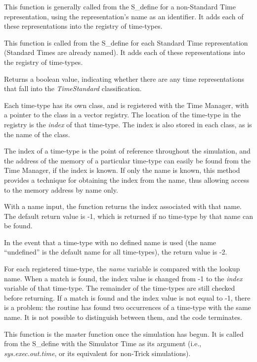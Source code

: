 {\begin{enumerate}
{\begin{enumerate}
This function is generally called from the S\_define for a non-Standard Time
representation, using the representation's name as an
identifier.  It adds each of these representations into the registry of
time-types.

This function is called from the S\_define for each Standard Time
representation (Standard Times are already named).  It adds each of these 
representations into the registry of time-types.

Returns a boolean value, indicating whether there are any time
representations that fall into the \textit{TimeStandard} classification.

\label{ref:timetypeslookup}Each time-type has its own class, and is
registered with the Time Manager, with a pointer to the class in a
vector registry.  The location of the time-type in the registry is the
\textit{index} of that time-type.  The index is also stored in each
class, as is the name of the class.

The index of a time-type is the point of reference throughout the
simulation, and the address of the memory of a particular time-type can
easily be found from the Time Manager, if the index is known.  If only the name
is known, this method provides a technique for obtaining the index from the
name, thus allowing access to the memory address by name only.

With a name input, the function returns the index associated with that
name.  The default return value is -1, which is returned if no
time-type by that name can be found.

In the event that a time-type with no defined name is used (the name
{\textquotedblleft}undefined{\textquotedblright} is the default name for all
time-types), the
return value is -2.

For each registered time-type, the \textit{name }variable is compared
with the lookup name.  When a match is found, the index value is
changed from -1 to the \textit{index} variable of that time-type.  The
remainder of the time-types are still checked before returning.  If a
match is found and the index value is not equal to -1, there is a
problem:  the routine has found two occurrences of a time-type with the
same name.  It is not possible to distinguish between them, and the
code terminates.

This function is the master function once the simulation has begun.  It
is called from the S\_define with the Simulator Time as its argument (i.e., 
\textit{sys.exec.out.time}, or its equivalent for non-Trick
simulations).


\end{enumerate}}
\end{enumerate}}
